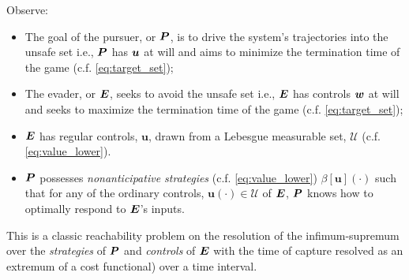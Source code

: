  Observe:
 \begin{itemize}
 	\item The goal of the pursuer, or $\bm{P}$, is to drive the system's trajectories into the unsafe set i.e., $\bm{P}$ has $\bm{u}$ at will and aims to minimize the termination time of the game  (c.f. \eqref{eq:target_set});
 	\item The evader, or $\bm{E}$, seeks to avoid the unsafe  set i.e., $\bm{E}$ has controls $\bm{w}$ at will and seeks to maximize the termination time of the game (c.f.  \eqref{eq:target_set});
 	\item $\bm{E}$ has regular controls, $\bm{u}$, drawn from a Lebesgue measurable set, $\mathcal{U}$ (c.f. \eqref{eq:value_lower}).
 	\item $\bm{P}$ possesses \textit{nonanticipative strategies} (c.f. \eqref{eq:value_lower}) \ie  $\beta[\bm{u}](\cdot)$ such that for any of the ordinary controls, $\bm{u}(\cdot) \in \mathcal{U}$ of $\bm{E}$, $\bm{P}$ knows how to optimally respond to $\bm{E}$'s inputs.
 \end{itemize}
 This is a classic reachability problem on the resolution of the infimum-supremum over the \textit{strategies} of $\bm{P}$ and \textit{controls} of $\bm{E}$ with the time of capture resolved as an extremum of a cost functional) over a time interval.%
 
